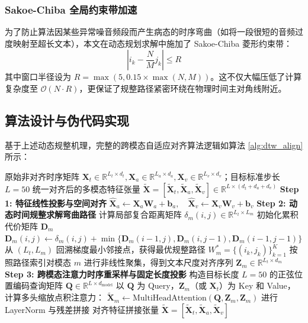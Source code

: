 \subsubsection{Sakoe-Chiba 全局约束带加速}
为了防止算法因某些异常噪音频段而产生病态的时序弯曲（如将一段很短的音频过度映射至超长文本），本文在动态规划求解中施加了 Sakoe-Chiba 菱形约束带：
\begin{equation}
|i_k - \frac{N}{M} j_k| \le R
\end{equation}
其中窗口半径设为 $R = \max(5, 0.15 \times \max(N, M))$。这不仅大幅压低了计算复杂度至 $\mathcal{O}(N \cdot R)$，更保证了规整路径紧密环绕在物理时间主对角线附近。

\subsection{算法设计与伪代码实现}
基于上述动态规整机理，完整的跨模态自适应对齐算法逻辑如算法 \ref{alg:dtw_align} 所示：

\begin{algorithm}[H]
\caption{基于动态时间规整与交叉注意力的多模态时序自适应对齐算法 (DTW-CrossAttn)}
\label{alg:dtw_align}
\begin{algorithmic}[1]
\Require 原始非对齐时序矩阵 $\mathbf{X}_t \in \mathbb{R}^{L_t \times d_t}, \mathbf{X}_a \in \mathbb{R}^{L_a \times d_a}, \mathbf{X}_v \in \mathbb{R}^{L_v \times d_v}$；目标标准步长 $L=50$
\Ensure 统一对齐后的多模态特征张量 $\tilde{\mathbf{X}} = [\tilde{\mathbf{X}}_t, \tilde{\mathbf{X}}_a, \tilde{\mathbf{X}}_v] \in \mathbb{R}^{L \times (d_t + d_a + d_v)}$
\State \textbf{Step 1: 特征线性投影与空间对齐}
\State $\hat{\mathbf{X}}_a \gets \mathbf{X}_a \mathbf{W}_a + \mathbf{b}_a, \quad \hat{\mathbf{X}}_v \gets \mathbf{X}_v \mathbf{W}_v + \mathbf{b}_v$ 
\State \textbf{Step 2: 动态时间规整求解弯曲路径}
    \State 计算局部复合距离矩阵 $\delta_m(i, j) \in \mathbb{R}^{L_t \times L_m}$
    \State 初始化累积代价矩阵 $\mathbf{D}_m$
        \State $\mathbf{D}_m(i, j) \gets \delta_m(i, j) + \min \{\mathbf{D}_m(i-1, j), \mathbf{D}_m(i, j-1), \mathbf{D}_m(i-1, j-1)\}$
    \EndFor
    \State 从 $(L_t, L_m)$ 回溯梯度最小邻接点，获得最优规整路径 $W_m^* = \{(i_k, j_k)\}_{k=1}^K$
    \State 按照路径索引对模态 $m$ 进行非线性聚集，得到文本尺度对齐序列 $\mathbf{Z}_m \in \mathbb{R}^{L_t \times d_m}$
\EndFor
\State \textbf{Step 3: 跨模态注意力时序重采样与固定长度投影}
\State 构造目标长度 $L=50$ 的正弦位置编码查询矩阵 $\mathbf{Q} \in \mathbb{R}^{L \times d_{\text{model}}}$
    \State 以 $\mathbf{Q}$ 为 Query，$\mathbf{Z}_m$（或 $\mathbf{X}_t$）为 Key 和 Value，计算多头缩放点积注意力：
    \State $\tilde{\mathbf{X}}_m \gets \text{MultiHeadAttention}(\mathbf{Q}, \mathbf{Z}_m, \mathbf{Z}_m)$
    \State 进行 LayerNorm 与残差拼接
\EndFor
\State \Return 对齐特征拼接张量 $\tilde{\mathbf{X}} = [\tilde{\mathbf{X}}_t, \tilde{\mathbf{X}}_a, \tilde{\mathbf{X}}_v]$
\end{algorithmic}
\end{algorithm}

